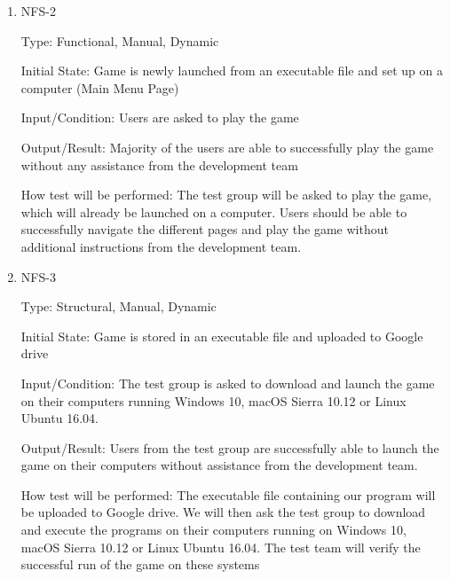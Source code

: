 \documentclass[12pt, titlepage]{article}
\begin{document}
	\begin{enumerate}
		
		
		\item{NFS-2\\}
		
		Type: Functional, Manual, Dynamic 
		
		Initial State: Game is newly launched from an executable file and set up on a computer (Main Menu Page)
		
		Input/Condition: Users are asked to play the game
		
		Output/Result: Majority of the users are able to successfully play the game without any assistance from the development team
		
		How test will be performed: The test group will be asked to play the game, which will already be launched on a computer. Users should be able to successfully navigate the different pages and play the game without additional instructions from the development team.
		
		\item{NFS-3\\}
		
		Type: Structural, Manual, Dynamic 
		
		Initial State: Game is stored in an executable file and uploaded to Google drive
		
		Input/Condition: The test group is asked to download and launch the game on their computers running Windows 10, macOS Sierra 10.12 or Linux Ubuntu 16.04.
		
		Output/Result: Users from the test group are successfully able to launch the game on their computers without assistance from the development team.
		
		How test will be performed: The executable file containing our program will be uploaded to Google drive. We will then ask the test group to download and execute the programs on their computers running on  Windows 10, macOS Sierra 10.12 or Linux Ubuntu 16.04. The test team will verify the successful run of the game on these systems
		
		
	\end{enumerate}
	
\end{document}

